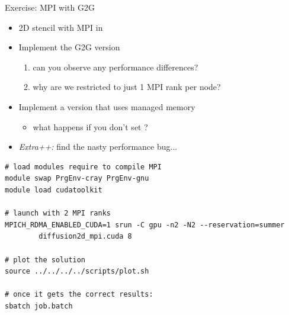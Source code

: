 \documentclass[aspectratio=43]{beamer}
\begin{document}
\begin{frame}[fragile]{Exercise: MPI with G2G}
    \begin{itemize}
        \item 2D stencil with MPI in 
        \item Implement the G2G version
        \begin{enumerate}
            \item can you observe any performance differences?
            \item why are we restricted to just 1 MPI rank per node?
        \end{enumerate}
        \item Implement a version that uses managed memory
        \begin{itemize}
            \item what happens if you don't set ?
        \end{itemize}
    \item \emph{Extra++:} find the nasty performance bug...
    \end{itemize}

    \begin{terminal}{}
        \begin{lstlisting}[style=terminal]
# load modules require to compile MPI
module swap PrgEnv-cray PrgEnv-gnu
module load cudatoolkit

# launch with 2 MPI ranks
MPICH_RDMA_ENABLED_CUDA=1 srun -C gpu -n2 -N2 --reservation=summer
        diffusion2d_mpi.cuda 8

# plot the solution
source ../../../../scripts/plot.sh

# once it gets the correct results:
sbatch job.batch
        \end{lstlisting}
   \end{terminal}

\end{frame}
\end{document}
